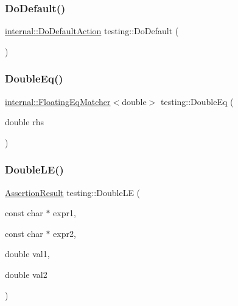 \subsubsection{\texorpdfstring{Do\+Default()}{DoDefault()}}
{\footnotesize\ttfamily \hyperlink{classtesting_1_1internal_1_1_do_default_action}{internal\+::\+Do\+Default\+Action} testing\+::\+Do\+Default (\begin{DoxyParamCaption}{ }\end{DoxyParamCaption})\hspace{0.3cm}{\ttfamily [inline]}}

\mbox{\label{namespacetesting_a1f49f9d97f03bfa4db26888f03486a9f}} 
\subsubsection{\texorpdfstring{Double\+Eq()}{DoubleEq()}}
{\footnotesize\ttfamily \hyperlink{classtesting_1_1internal_1_1_floating_eq_matcher}{internal\+::\+Floating\+Eq\+Matcher}$<$double$>$ testing\+::\+Double\+Eq (\begin{DoxyParamCaption}\item[{double}]{rhs }\end{DoxyParamCaption})\hspace{0.3cm}{\ttfamily [inline]}}

\mbox{\label{namespacetesting_ae10e2bb304b74abd1b06a2d912a8b43b}} 
\subsubsection{\texorpdfstring{Double\+L\+E()}{DoubleLE()}}
{\footnotesize\ttfamily \hyperlink{classtesting_1_1_assertion_result}{Assertion\+Result} testing\+::\+Double\+LE (\begin{DoxyParamCaption}\item[{const char $\ast$}]{expr1,  }\item[{const char $\ast$}]{expr2,  }\item[{double}]{val1,  }\item[{double}]{val2 }\end{DoxyParamCaption})}

\mbox{\label{namespacetesting_aaee08ecb6815ef8398bbcb4e56d56d44}} 

